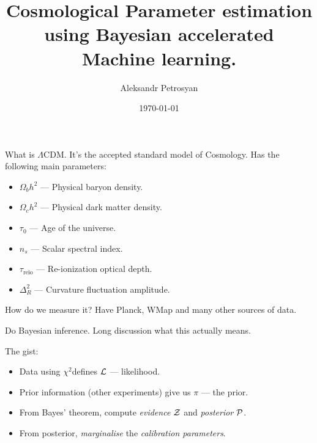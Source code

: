 \documentclass[bigger]{beamer}
\author{Aleksandr Petrosyan}
\date{\today}
\title{Cosmological Parameter estimation using Bayesian accelerated Machine learning.}
\begin{document}
\maketitle

\begin{frame}[label={sec:orge6b6c72}]{What is \(\Lambda\)CDM.}
It's the accepted standard model of Cosmology. 
Has the following main parameters:
\begin{itemize}
\item \(\Omega_{b}h^{2}\) --- Physical baryon density.
\item \(\Omega_{c}h^{2}\) --- Physical dark matter density.
\item \(\tau_{0}\) --- Age of the universe.
\item \(n_{s}\) --- Scalar spectral index.
\item \(\tau_\text{reio}\) --- Re-ionization optical depth.
\item \(\Delta_{R}^{2}\) --- Curvature fluctuation amplitude.
\end{itemize}
\end{frame}

\begin{frame}[label={sec:orga7c365a}]{How do we measure it?}
Have Planck, WMap and many other sources of data.

Do Bayesian inference. Long discussion what this actually means. 

The gist: 
\begin{itemize}
\item Data using \(\chi^{2}\)defines \({\cal L}\) --- likelihood.
\item Prior information (other experiments) give us \(\pi\) --- the prior.
\item From Bayes' theorem, compute \emph{evidence} \({\cal Z}\) and \emph{posterior} \({\cal P}\).
\item From posterior, \emph{marginalise} the \emph{calibration parameters}.
\end{itemize}
\end{frame}
\end{document}
